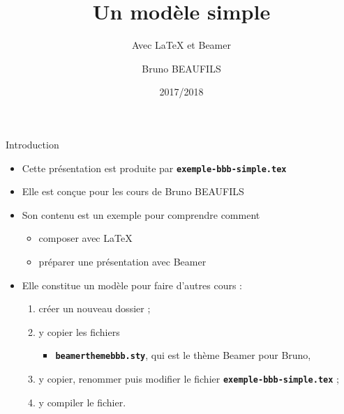 \documentclass[10pt,t]{beamer}
\title[Cours]{Un modèle simple}
\subtitle{Avec \LaTeX{} et Beamer}
\author{Bruno BEAUFILS}
\institute[]{Université Lille~1 \and IUT «A»}
\date{2017/2018}
\begin{document}
\maketitle


\begin{frame}{Introduction} 

  \begin{itemize}
  \item Cette présentation est produite par \texttt{\textbf{exemple-bbb-simple.tex}}
  \item Elle est conçue pour les cours de Bruno BEAUFILS
  \item Son contenu est un exemple pour comprendre comment

    \begin{itemize}
    \item composer avec \LaTeX{}
    \item préparer une présentation avec Beamer
    \end{itemize}

  \end{itemize}

  \pause


  \begin{itemize}
  \item Elle constitue un modèle pour faire d'autres cours :
      
    \begin{enumerate}
    \item créer un nouveau dossier ;
    \item y copier les fichiers 
      
      \begin{itemize}
      \item \texttt{\textbf{beamerthemebbb.sty}}, qui est le thème Beamer pour Bruno,
      \end{itemize}
      
    \item y copier, renommer puis modifier le fichier \texttt{\textbf{exemple-bbb-simple.tex}} ;
    \item y compiler le fichier.
    \end{enumerate}
  \end{itemize}
\end{frame}
\end{document}
